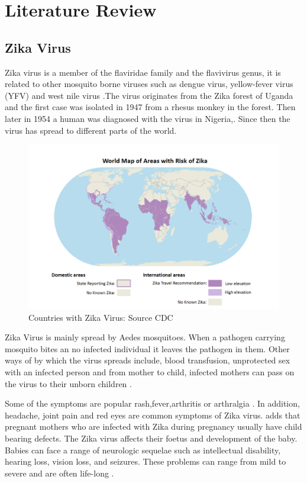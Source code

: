 \chapter{Literature Review}
\section{Zika Virus}
Zika virus is a member of the flaviridae family
and the flavivirus genus, it is related to other mosquito borne viruses such as dengue virus, yellow-fever  virus (YFV)  and west nile virus \citep{doi}.The virus originates from the Zika forest of Uganda and the first case was isolated in 1947 from a rhesus monkey in the forest. Then later in 1954 a human was diagnosed with the virus in Nigeria,\citep{2015zika}. Since then the virus has spread to different parts of the world. 
\begin{figure}[h!]
\centering
\includegraphics[scale=0.5]{images/map_zika.png} 
\caption{Countries with Zika Virus: Source CDC}\label{fig 1}
\end{figure}


Zika Virus is mainly spread by Aedes mosquitoes. When a pathogen carrying mosquito bites an no infected individual it leaves the pathogen in them. Other ways of by which the virus spreads include, blood transfusion, unprotected sex with an infected person and from mother to child, infected mothers can pass on the virus to their unborn children \citep{musso2014}.

 Some of the symptoms are popular rash,fever,arthritis or arthralgia \cite{musso2015}. In addition, headache, joint pain and red eyes are common symptoms of Zika virus. \cite{simoes2016zika}  adds that pregnant mothers who are infected with Zika during pregnancy usually have child bearing defects. The Zika virus affects their foetus and development of the baby. Babies can face a range of neurologic sequelae such as intellectual disability, hearing loss, vision loss, and seizures. These problems can range from mild to severe and are often life-long \citep{rasmussen2016zika}.

